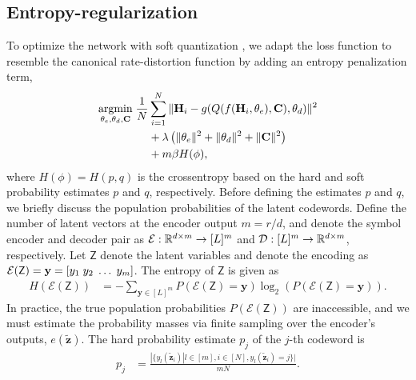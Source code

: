 \subsection{Entropy-regularization}
To optimize the network with soft quantization \cite{ref:Agustsson2017SoftToHard}, we adapt the loss function to resemble the canonical rate-distortion function by adding an entropy penalization term,
\begin{align}
\underset{\theta_e, \theta_d, \mathbf C}{\text{argmin}}\; \frac 1N &\sum_{i=1}^N\Arrowvert \mathbf H_i - g(Q(f(\mathbf H_i, \theta_e), \mathbf C), \theta_d) \Arrowvert^2 \nonumber \\
&+ \lambda \left(\Arrowvert\theta_e\Arrowvert^2+\Arrowvert\theta_d\Arrowvert^2+\Arrowvert \mathbf C \Arrowvert^2\right) \label{eq:loss_entropy} \\
&+ m\beta H(\phi), \nonumber
\end{align}
where $H(\phi)=H(p,q)$ is the crossentropy based on the hard and soft probability estimates $p$ and $q$, respectively. Before defining the estimates $p$ and $q$, we briefly discuss the population probabilities of the latent codewords. Define the number of latent vectors at the encoder output $m = r / d$, and denote the symbol encoder and decoder pair as ${\cal E}:\mathbb R^{d\times m} \to [L]^m$
and ${\cal D}:[L]^m \to \mathbb R^{d\times m}$, respectively.
Let $\mathsf Z$ denote the latent variables 
and denote the encoding as ${\cal E}(\mathsf Z)=\mathbf y=[y_1\; y_2\;\dots\; y_m]$. The entropy of $\mathsf Z$ is given as 
\begin{align*}
H(\mathcal E(\mathsf Z)) &= -\sum_{\mathbf y\in[L]^m}P(\mathcal E(\mathsf Z) = \mathbf y)\log_2(P(\mathcal E(\mathsf Z)=\mathbf y)).
\end{align*}
In practice, the true population probabilities $P(\mathcal E(\mathsf Z))$ are inaccessible, and we must estimate the probability masses via finite sampling over the encoder's outputs, $e(\tilde{\mathbf z})$. The hard probability estimate $p_j$ of the $j$-th codeword is
\begin{align*}
p_j &= \frac{|\{y_l(\tilde{\mathbf z}_i)|l\in[m], i \in [N], y_l(\tilde{\mathbf z}_i)=j\}|}{mN}.
\end{align*}
